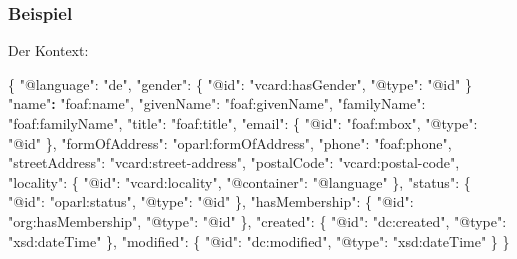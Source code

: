\documentclass[,a4paper]{article}
\newenvironment{Shaded}{}{}
\newcommand{\DataTypeTok}[1]{\textcolor[rgb]{0.56,0.13,0.00}{{#1}}}
\newcommand{\StringTok}[1]{\textcolor[rgb]{0.25,0.44,0.63}{{#1}}}
\newcommand{\FunctionTok}[1]{\textcolor[rgb]{0.02,0.16,0.49}{{#1}}}
\newcommand{\ErrorTok}[1]{\textcolor[rgb]{1.00,0.00,0.00}{\textbf{{#1}}}}
\begin{document}
\subsubsection{Beispiel}\label{beispiel-3}

Der Kontext:

\begin{Shaded}
\begin{Highlighting}[]
\FunctionTok{\{}
    \DataTypeTok{"@language"}\FunctionTok{:} \StringTok{"de"}\FunctionTok{,}
    \DataTypeTok{"gender"}\FunctionTok{:} \FunctionTok{\{}
        \DataTypeTok{"@id"}\FunctionTok{:} \StringTok{"vcard:hasGender"}\FunctionTok{,}
        \DataTypeTok{"@type"}\FunctionTok{:} \StringTok{"@id"}
    \FunctionTok{\}}
    \StringTok{"name"}\ErrorTok{:} \StringTok{"foaf:name"}\FunctionTok{,}
    \DataTypeTok{"givenName"}\FunctionTok{:} \StringTok{"foaf:givenName"}\FunctionTok{,}
    \DataTypeTok{"familyName"}\FunctionTok{:} \StringTok{"foaf:familyName"}\FunctionTok{,}
    \DataTypeTok{"title"}\FunctionTok{:} \StringTok{"foaf:title"}\FunctionTok{,}
    \DataTypeTok{"email"}\FunctionTok{:} \FunctionTok{\{}
        \DataTypeTok{"@id"}\FunctionTok{:} \StringTok{"foaf:mbox"}\FunctionTok{,}
        \DataTypeTok{"@type"}\FunctionTok{:} \StringTok{"@id"}
    \FunctionTok{\},}
    \DataTypeTok{"formOfAddress"}\FunctionTok{:} \StringTok{"oparl:formOfAddress"}\FunctionTok{,}
    \DataTypeTok{"phone"}\FunctionTok{:} \StringTok{"foaf:phone"}\FunctionTok{,}
    \DataTypeTok{"streetAddress"}\FunctionTok{:} \StringTok{"vcard:street-address"}\FunctionTok{,}
    \DataTypeTok{"postalCode"}\FunctionTok{:} \StringTok{"vcard:postal-code"}\FunctionTok{,}
    \DataTypeTok{"locality"}\FunctionTok{:} \FunctionTok{\{}
        \DataTypeTok{"@id"}\FunctionTok{:} \StringTok{"vcard:locality"}\FunctionTok{,}
        \DataTypeTok{"@container"}\FunctionTok{:} \StringTok{"@language"}
    \FunctionTok{\},}
    \DataTypeTok{"status"}\FunctionTok{:} \FunctionTok{\{}
        \DataTypeTok{"@id"}\FunctionTok{:} \StringTok{"oparl:status"}\FunctionTok{,}
        \DataTypeTok{"@type"}\FunctionTok{:} \StringTok{"@id"}
    \FunctionTok{\},}
    \DataTypeTok{"hasMembership"}\FunctionTok{:} \FunctionTok{\{}
        \DataTypeTok{"@id"}\FunctionTok{:} \StringTok{"org:hasMembership"}\FunctionTok{,}
        \DataTypeTok{"@type"}\FunctionTok{:} \StringTok{"@id"}
    \FunctionTok{\},}
    \DataTypeTok{"created"}\FunctionTok{:} \FunctionTok{\{}
        \DataTypeTok{"@id"}\FunctionTok{:} \StringTok{"dc:created"}\FunctionTok{,}
        \DataTypeTok{"@type"}\FunctionTok{:} \StringTok{"xsd:dateTime"}
    \FunctionTok{\},}
    \DataTypeTok{"modified"}\FunctionTok{:} \FunctionTok{\{}
        \DataTypeTok{"@id"}\FunctionTok{:} \StringTok{"dc:modified"}\FunctionTok{,}
        \DataTypeTok{"@type"}\FunctionTok{:} \StringTok{"xsd:dateTime"}
    \FunctionTok{\}}
\FunctionTok{\}}
\end{Highlighting}
\end{Shaded}
\end{document}
